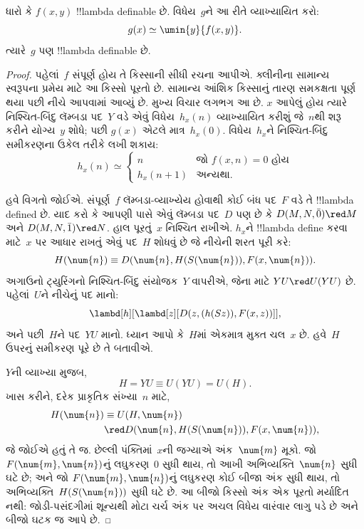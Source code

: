 \documentclass[../../../include/open-logic-section]{subfiles}
\begin{document}

\begin{lem}
ધારો કે $f(x,y)$ !!{lambda definable} છે. વિધેય~$g$ને
આ રીતે વ્યાખ્યાયિત કરો:
\[
g(x) \simeq \umin{y}{f(x,y)}.
\]
ત્યારે~$g$ પણ !!{lambda definable} છે.
\end{lem}

\begin{proof}
પહેલાં~$f$ સંપૂર્ણ હોય તે કિસ્સાની સીધી રચના આપીએ. ક્લીનીના
સામાન્ય સ્વરૂપના પ્રમેય માટે આ કિસ્સો પૂરતો છે. સામાન્ય આંશિક
કિસ્સાનું તારણ સમકક્ષતા પૂર્ણ થયા પછી નીચે આપવામાં આવ્યું છે.
મુખ્ય વિચાર લગભગ આ છે. $x$ આપેલું હોય ત્યારે નિશ્ચિત-બિંદુ
લૅમ્બડા પદ~$Y$ વડે એવું વિધેય~$h_x(n)$ વ્યાખ્યાયિત કરીશું જે~$n$થી
શરૂ કરીને યોગ્ય~$y$ શોધે; પછી $g(x)$ એટલે માત્ર~$h_x(0)$.
વિધેય~$h_x$ને નિશ્ચિત-બિંદુ સમીકરણના ઉકેલ તરીકે લખી શકાય:
\[
h_x(n) \simeq
\begin{cases}
n & \text{જો $f(x,n) = 0$ હોય} \\
h_x(n+1) & \text{અન્યથા.}
\end{cases}
\]

હવે વિગતો જોઈએ. સંપૂર્ણ~$f$ લૅમ્બડા-વ્યાખ્યેય હોવાથી કોઈ બંધ પદ~$F$
વડે તે !!{lambda defined} છે. યાદ કરો કે આપણી પાસે એવું લૅમ્બડા
પદ~$D$ પણ છે કે $D(M, N, \bar{0}) \red M$ અને $D(M, N, \bar{1})
\red N$. હાલ પૂરતું~$x$ નિશ્ચિત રાખીએ. $h_x$ને
!!{lambda define} કરવા માટે~$x$ પર આધાર રાખતું એવું પદ~$H$
શોધવું છે જે નીચેની શરત પૂરી કરે:
\[
H(\num{n}) \equiv D(\num{n}, H(S(\num{n})), F(x, \num{n})).
\]
અગાઉનો ટ્યુરિંગનો નિશ્ચિત-બિંદુ સંયોજક~$Y$ વાપરીએ, જેના માટે
$YU\red U(YU)$ છે. પહેલાં~$U$ને નીચેનું
પદ માનો:
\[
\lambd[h][\lambd[z][D(z,(h(Sz)),F(x,z))]],
\]
અને પછી~$H$ને પદ~$YU$ માનો. ધ્યાન આપો કે~$H$માં એકમાત્ર મુક્ત
ચલ~$x$ છે. હવે~$H$ ઉપરનું સમીકરણ પૂરે છે તે બતાવીએ.

$Y$ની વ્યાખ્યા મુજબ,
\[
H = YU \equiv U(YU) = U(H).
\]
ખાસ કરીને, દરેક પ્રાકૃતિક સંખ્યા~$n$ માટે,
\begin{align*}
H(\num{n}) & \equiv U(H, \num{n}) \\
& \red D(\num{n}, H(S(\num{n})), F(x, \num{n})),
\end{align*}
જે જોઈએ હતું તે જ. છેલ્લી પંક્તિમાં~$x$ની જગ્યાએ અંક~$\num{m}$
મૂકો. જો $F(\num{m}, \num{n})$નું લઘુકરણ~$\num{0}$ સુધી થાય,
તો આખી અભિવ્યક્તિ~$\num{n}$ સુધી ઘટે છે; અને જો
$F(\num{m}, \num{n})$નું લઘુકરણ કોઈ બીજા અંક સુધી થાય,
તો અભિવ્યક્તિ~$H(S(\num{n}))$ સુધી ઘટે છે.
આ બીજો કિસ્સો અંક એક પૂરતો મર્યાદિત નથી: જોડી-પસંદગીમાં શૂન્યથી
મોટા ચર્ચ અંક પર અચલ વિધેય વારંવાર લાગુ પડે છે અને બીજો ઘટક જ આપે છે.


\end{proof}
\end{document}
